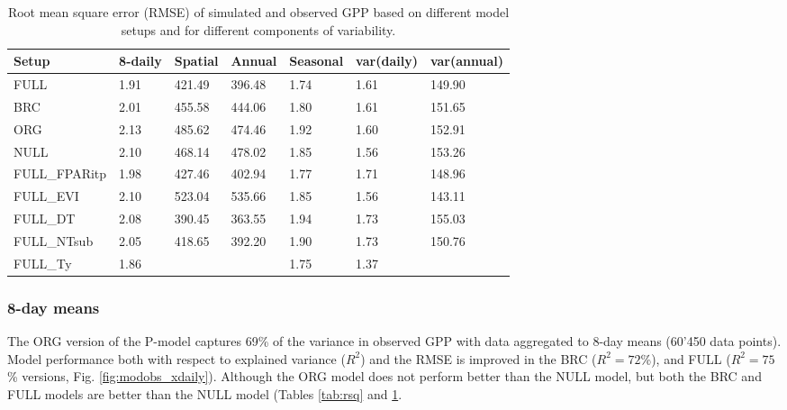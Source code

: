 \documentclass{myreport}
\begin{document}
\begin{table}
\centering
\begin{tabular}{lllllll}
  \toprule
  Setup & 8-daily & Spatial & Annual & Seasonal & var(daily) & var(annual) \\ 
  \midrule
  FULL & 1.91 & 421.49 & 396.48 & 1.74 & 1.61 & 149.90 \\ 
  BRC & 2.01 & 455.58 & 444.06 & 1.80 & 1.61 & 151.65 \\ 
  ORG & 2.13 & 485.62 & 474.46 & 1.92 & 1.60 & 152.91 \\ 
  NULL & 2.10 & 468.14 & 478.02 & 1.85 & 1.56 & 153.26 \\ 
  \midrule
  FULL\_FPARitp & 1.98 & 427.46 & 402.94 & 1.77 & 1.71 & 148.96 \\ 
  FULL\_EVI & 2.10 & 523.04 & 535.66 & 1.85 & 1.56 & 143.11 \\ 
  \midrule
  FULL\_DT & 2.08 & 390.45 & 363.55 & 1.94 & 1.73 & 155.03 \\ 
  FULL\_NTsub & 2.05 & 418.65 & 392.20 & 1.90 & 1.73 & 150.76 \\ 
  FULL\_Ty & 1.86 &  &  & 1.75 & 1.37 & \\ 
  \bottomrule
  \end{tabular}
\caption{Root mean square error (RMSE) of simulated and observed GPP based on different model setups and for different components of variability.} 
\label{tab:rmse}
\end{table}

\subsubsection{8-day means}

The ORG version of the P-model captures 69\% of the variance in observed GPP with data aggregated to 8-day means (60’450 data points). Model performance both with respect to explained variance ($R^2$) and the RMSE is improved in the BRC  ($R^2 = 72$\%), and FULL ($R^2 = 75$\% versions, Fig. \ref{fig:modobs_xdaily}). Although the ORG model does not perform better than the NULL model, but both the BRC and FULL models are better than the NULL model (Tables \ref{tab:rsq} and \ref{tab:rmse}. %
\end{document}
